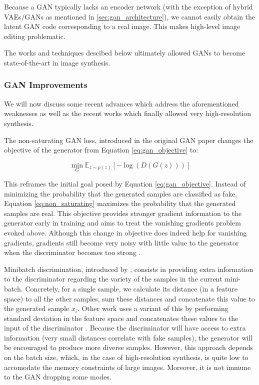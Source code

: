  Because a \ac{GAN} typically lacks an encoder network (with the exception of hybrid \ac{VAE}s/\ac{GAN}s
as mentioned in \ref{sec:gan_architecture}), we cannot easily obtain the latent \ac{GAN} code 
corresponding to a real image. This makes high-level image editing problematic. 

The works and techniques descibed below ultimately allowed \ac{GAN}s to become state-of-the-art in image synthesis.


\subsubsection{GAN Improvements}

We will now discuss some recent advances which address the aforementioned weaknesses as well as the 
recent works which finally allowed very high-resolution synthesis.

 The non-saturating GAN loss, introduced in the original \ac{GAN}
paper \citep{goodfellowgans} changes the objective of the 
generator from Equation \ref{eq:gan_objective} to:

\begin{equation}\label{eq:non_saturating}
      \min_G \mathbb{E}_{z \sim p(z)}[-\log(D(G(z)))]
\end{equation}

This reframes the initial goal posed by Equation \ref{eq:gan_objective}. Instead of minimizing the 
probability that the generated samples are 
classified as fake, Equation \ref{eq:non_saturating} maximizes the probability that the generated 
samples are real. This objective provides stronger gradient information to the generator early in 
training and aims to treat the vanishing gradients problem evoked above. Although this change in 
objective does indeed help for vanishing gradients, gradients still become very noisy with little
value to the generator when the discriminator becomes too strong \citep{arjovsky2017towards}.


Minibatch discrimination, introduced by \cite{improved_techniques_gans}, consists in providing 
extra information to the discriminator regarding the variety of the samples in the current mini-batch. 
Concretely, for a single sample, we calculate its distance (in a feature space) to all the other samples, 
 sum these distances and concatenate this value to the generated sample $x_i$. Other work uses a variant of 
 this by performing standard deviation in the feature space and concatenates these values to the input of 
 the discriminator \citep{karras2018progressive}. Because the discriminator will 
 have access to extra information (very small distances correlate with fake samples), the generator will 
 be encouraged to produce more diverse samples. However, this approach depends on the batch size, which, 
 in the case of high-resolution synthesis, is quite low to accomodate the memory constraints of large images.
 Moreover, it is not immune to the \ac{GAN} dropping some modes. 

